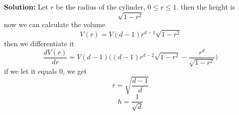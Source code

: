 \documentclass[a4paper, 12pt]{mcshw}
\begin{document}
\begin{enumerate}
        \textbf{Solution:} Let $r$ be the radius of the cylinder, $0 \leq r \leq 1$.
        then the height is
        $$
        \sqrt{1-r^2}
        $$
        now we can calculate the volume
        $$
        V(r)=V(d-1)r^{d-1}\sqrt{1-r^2}
        $$
        then we differentiate it
        $$
        \frac{dV(r)}{dr}=V(d-1)\Big((d-1)r^{d-2}\sqrt{1-r^2}-\frac{r^d}{\sqrt{1-r^2}}\Big)
        $$
        if we let it equals 0, we get
        $$
        r=\sqrt{\frac{d-1}{d}} 
        $$
        $$
        h=\frac{1}{\sqrt{d}}
        $$
        
    \end{enumerate}
\end{document}
